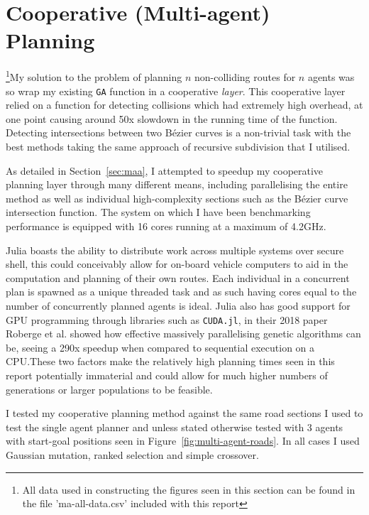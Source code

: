 \section{Cooperative (Multi-agent) Planning}
\label{subsec:eval-cooperativeplanning}

\footnote{All data used in constructing the figures seen in this section can be found in the file 'ma-all-data.csv' included with this report}My solution to the problem of planning $n$ non-colliding routes for $n$ agents was so wrap my existing \texttt{GA} function in a cooperative \textit{layer}. This cooperative layer relied on a function for detecting collisions which had extremely high overhead, at one point causing around 50x slowdown in the running time of the function. Detecting intersections between two Bézier curves is a non-trivial task with the best methods taking the same approach of recursive subdivision that I utilised.

As detailed in Section~\ref{sec:maa}, I attempted to speedup my cooperative planning layer through many different means, including parallelising the entire method as well as individual high-complexity sections such as the Bézier curve intersection function. The system on which I have been benchmarking performance is equipped with 16 cores running at a maximum of 4.2GHz.

Julia boasts the ability to distribute work across multiple systems over secure shell, this could conceivably allow for on-board vehicle computers to aid in the computation and planning of their own routes. Each individual in a concurrent plan is spawned as a unique threaded task and as such having cores equal to the number of concurrently planned agents is ideal. Julia also has good support for GPU programming through libraries such as \texttt{CUDA.jl}\cite{besard2018juliagpu}, in their 2018 paper Roberge et al.\cite{robergeFastGeneticAlgorithm2018} showed how effective massively parallelising genetic algorithms can be, seeing a 290x speedup when compared to sequential execution on a CPU.\@ These two factors make the relatively high planning times seen in this report potentially immaterial and could allow for much higher numbers of generations or larger populations to be feasible.

I tested my cooperative planning method against the same road sections I used to test the single agent planner and unless stated otherwise tested with 3 agents with start-goal positions seen in Figure~\ref{fig:multi-agent-roads}. In all cases I used Gaussian mutation, ranked selection and simple crossover.

